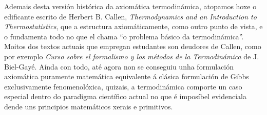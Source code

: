 \begin{refsection}
\begin{multicols}{2}
Ademais desta versión histórica da axiomática termodinámica, atopamos hoxe o
edificante escrito de Herbert B. Callen, \textit{Thermodynamics and an
Introduction to Thermostatistics}, que a estructura axiomáticamente, como outro
punto de vista, e o fundamenta todo no que el chama ``o problema básico da
termodinámica''. Moitos dos textos actuais que empregan estudantes son deudores
de Callen, como por exemplo \textit{Curso sobre el formalismo y los métodos de
la Termodinámica} de J. Biel-Gayé. Aínda con todo, até agora non se conseguiu
unha formulación axiomática puramente matemática equivalente á clásica
formulación de Gibbs exclusivamente fenomenolóxica, quizais, a termodinámica
comporte un caso especial dentro do paradigma científico actual no que é
imposíbel evidenciala dende uns principios matemáticos xerais e primitivos.

\nocite{berenguer.raa_2014}
\nocite{a.lp.berberan-santos.mn_1999}
\nocite{caratheodory.c_1909}
\nocite{planck.m_1926}
\nocite{callen.hb_1960}
\printbibliography

\end{multicols}
\end{refsection}
